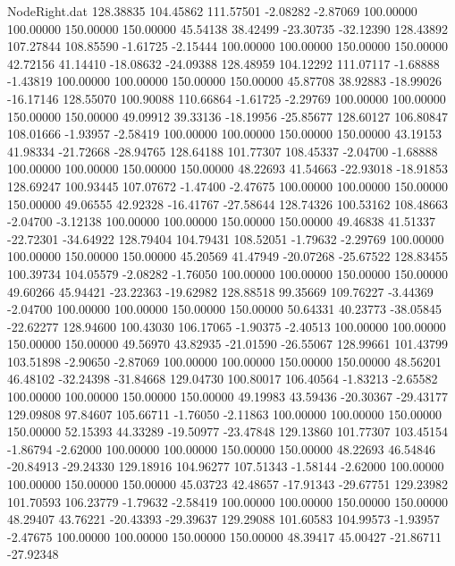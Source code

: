 \begin{filecontents}{NodeRight.dat}
 128.38835  104.45862  111.57501    -2.08282   -2.87069  100.00000  100.00000  150.00000  150.00000   45.54138   38.42499  -23.30735  -32.12390
 128.43892  107.27844  108.85590    -1.61725   -2.15444  100.00000  100.00000  150.00000  150.00000   42.72156   41.14410  -18.08632  -24.09388
 128.48959  104.12292  111.07117    -1.68888   -1.43819  100.00000  100.00000  150.00000  150.00000   45.87708   38.92883  -18.99026  -16.17146
 128.55070  100.90088  110.66864    -1.61725   -2.29769  100.00000  100.00000  150.00000  150.00000   49.09912   39.33136  -18.19956  -25.85677
 128.60127  106.80847  108.01666    -1.93957   -2.58419  100.00000  100.00000  150.00000  150.00000   43.19153   41.98334  -21.72668  -28.94765
 128.64188  101.77307  108.45337    -2.04700   -1.68888  100.00000  100.00000  150.00000  150.00000   48.22693   41.54663  -22.93018  -18.91853
 128.69247  100.93445  107.07672    -1.47400   -2.47675  100.00000  100.00000  150.00000  150.00000   49.06555   42.92328  -16.41767  -27.58644
 128.74326  100.53162  108.48663    -2.04700   -3.12138  100.00000  100.00000  150.00000  150.00000   49.46838   41.51337  -22.72301  -34.64922
 128.79404  104.79431  108.52051    -1.79632   -2.29769  100.00000  100.00000  150.00000  150.00000   45.20569   41.47949  -20.07268  -25.67522
 128.83455  100.39734  104.05579    -2.08282   -1.76050  100.00000  100.00000  150.00000  150.00000   49.60266   45.94421  -23.22363  -19.62982
 128.88518   99.35669  109.76227    -3.44369   -2.04700  100.00000  100.00000  150.00000  150.00000   50.64331   40.23773  -38.05845  -22.62277
 128.94600  100.43030  106.17065    -1.90375   -2.40513  100.00000  100.00000  150.00000  150.00000   49.56970   43.82935  -21.01590  -26.55067
 128.99661  101.43799  103.51898    -2.90650   -2.87069  100.00000  100.00000  150.00000  150.00000   48.56201   46.48102  -32.24398  -31.84668
 129.04730  100.80017  106.40564    -1.83213   -2.65582  100.00000  100.00000  150.00000  150.00000   49.19983   43.59436  -20.30367  -29.43177
 129.09808   97.84607  105.66711    -1.76050   -2.11863  100.00000  100.00000  150.00000  150.00000   52.15393   44.33289  -19.50977  -23.47848
 129.13860  101.77307  103.45154    -1.86794   -2.62000  100.00000  100.00000  150.00000  150.00000   48.22693   46.54846  -20.84913  -29.24330
 129.18916  104.96277  107.51343    -1.58144   -2.62000  100.00000  100.00000  150.00000  150.00000   45.03723   42.48657  -17.91343  -29.67751
 129.23982  101.70593  106.23779    -1.79632   -2.58419  100.00000  100.00000  150.00000  150.00000   48.29407   43.76221  -20.43393  -29.39637
 129.29088  101.60583  104.99573    -1.93957   -2.47675  100.00000  100.00000  150.00000  150.00000   48.39417   45.00427  -21.86711  -27.92348

\end{filecontents}
